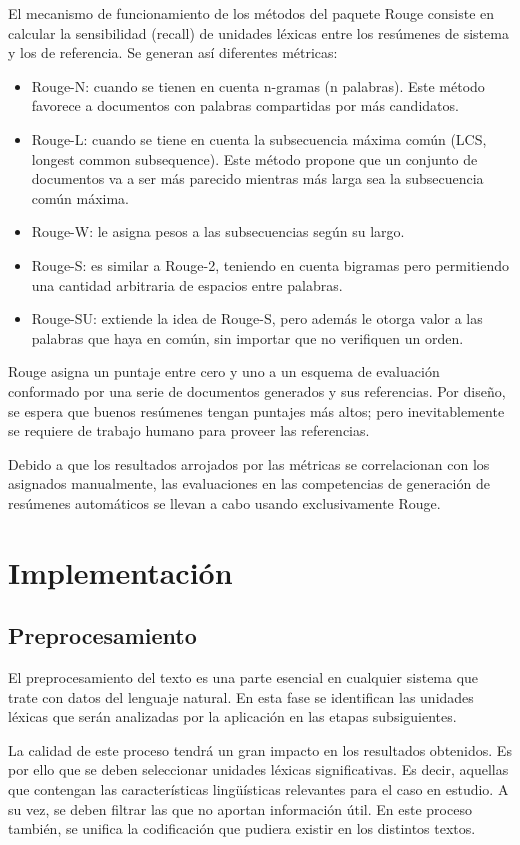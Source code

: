 \documentclass[a4paper]{article}
\begin{document}
El mecanismo de funcionamiento de los métodos del paquete Rouge consiste en calcular la sensibilidad (recall) de unidades léxicas entre los resúmenes de sistema y los de referencia. Se generan así diferentes métricas:
\begin{itemize}
\item Rouge-N: cuando se tienen en cuenta n-gramas (n palabras). Este método favorece a documentos con palabras compartidas por más candidatos.
\item Rouge-L: cuando se tiene en cuenta la subsecuencia máxima común (LCS, longest common subsequence). Este método propone que un conjunto de documentos va a ser más parecido mientras más larga sea la subsecuencia común máxima.
\item Rouge-W: le asigna pesos a las subsecuencias según su largo.
\item Rouge-S: es similar a Rouge-2, teniendo en cuenta bigramas pero permitiendo una cantidad arbitraria de espacios entre palabras.
\item Rouge-SU: extiende la idea de Rouge-S, pero además le otorga valor a las palabras que haya en común, sin importar que no verifiquen un orden.
\end{itemize}

Rouge asigna un puntaje entre cero y uno a un esquema de evaluación conformado por una serie de documentos generados y sus referencias. Por diseño, se espera que buenos resúmenes tengan puntajes más altos; pero inevitablemente se requiere de trabajo humano para proveer las referencias.

Debido a que los resultados arrojados por las métricas se correlacionan con los asignados manualmente, las evaluaciones en las competencias de generación de resúmenes automáticos se llevan a cabo usando exclusivamente Rouge.


\section{Implementación}
\subsection{Preprocesamiento}
El preprocesamiento del texto es una parte esencial en cualquier sistema que trate con datos del lenguaje natural. En esta fase se identifican las unidades léxicas que serán analizadas por la aplicación en las etapas subsiguientes. 

La calidad de este proceso tendrá un gran impacto en los resultados obtenidos. Es por ello que se deben seleccionar unidades léxicas significativas. Es decir, aquellas que contengan las características lingüísticas relevantes para el caso en estudio. A su vez, se deben filtrar las que no aportan información útil. En este proceso también, se unifica la codificación que pudiera existir en los distintos textos.
\end{document}
